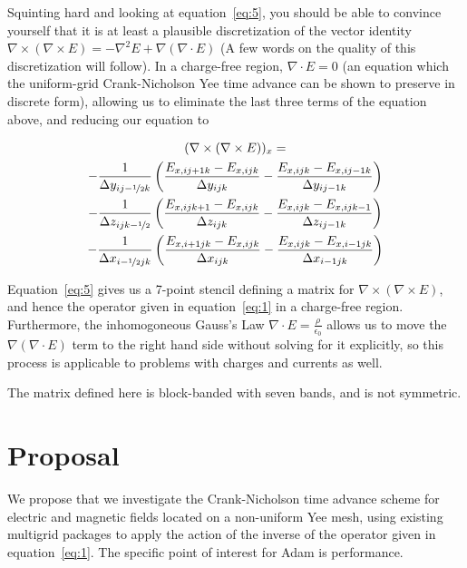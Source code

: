 \documentclass{article}
\newcommand{\Fijk}[5]{{#1}_{{#2},{#3}{#4}{#5}}}
\newcommand{\curl}[1]{\nabla \times {#1}}
\newcommand{\dxijk}[3]{\Delta x _{{#1}{#2}{#3}}}
\newcommand{\dyijk}[3]{\Delta y _{{#1}{#2}{#3}}}
\newcommand{\dzijk}[3]{\Delta z _{{#1}{#2}{#3}}}
\newcommand{\dxdual}{\Delta x_{i-\nicefrac{1}{2}jk}}
\newcommand{\dydual}{\Delta y_{ij-\nicefrac{1}{2}k}}
\newcommand{\dzdual}{\Delta z_{ijk-\nicefrac{1}{2}}}
\newcommand{\delxe}{(\curl{E})}
\begin{document}
Squinting hard and looking at equation~\ref{eq:5}, you should be able
to convince yourself that it is at least a plausible discretization of
the vector identity $\curl{ \delxe} = -\nabla^2 E + \nabla (\nabla
\cdot E)$ (A few words on the quality of this discretization will
follow).  In a charge-free region, $\nabla \cdot E = 0$ (an equation
which the uniform-grid Crank-Nicholson Yee time advance can be shown
to preserve in discrete form), allowing us to eliminate the last three
terms of the equation above, and reducing our equation to 

\begin{multline}
  \label{eq:6}
  (\curl{ \delxe})_x = \\
  - \frac{1}{\dydual}
  \left( \frac{  \Fijk{E}{x}{i}{j+1}{k}  - \Fijk{E}{x}{i}{j}{k}}
    {\dyijk{i}{j}{k}}
    - \frac{  \Fijk{E}{x}{i}{j}{k}  - \Fijk{E}{x}{i}{j-1}{k}}
    {\dyijk{i}{j-1}{k}} \right) \\
  - \frac{1}{\dzdual}
  \left( \frac{  \Fijk{E}{x}{i}{j}{k+1}  - \Fijk{E}{x}{i}{j}{k}}
    {\dzijk{i}{j}{k}}
    - \frac{  \Fijk{E}{x}{i}{j}{k}  - \Fijk{E}{x}{i}{j}{k-1}}
    {\dzijk{i}{j-1}{k}} \right) \\
  - \frac{1}{\dxdual}
  \left( \frac{  \Fijk{E}{x}{i+1}{j}{k}  - \Fijk{E}{x}{i}{j}{k}}
    {\dxijk{i}{j}{k}}
    - \frac{  \Fijk{E}{x}{i}{j}{k}  - \Fijk{E}{x}{i-1}{j}{k}}
    {\dxijk{i-1}{j}{k}} \right)
\end{multline}

Equation~\ref{eq:5} gives us a 7-point stencil defining a matrix for
$\curl{\delxe}$, and hence the operator given in equation~\ref{eq:1}
in a charge-free region.  Furthermore, the
inhomogoneous Gauss's Law $\nabla \cdot E = \frac{\rho}{\epsilon_0}$
allows us to move the $\nabla(\nabla \cdot E)$ term to the right hand
side without solving for it explicitly, so this process is applicable
to problems with charges and currents as well.

The matrix defined here is block-banded with seven bands, and is not
symmetric.

\section{Proposal}

We propose that we investigate the Crank-Nicholson time advance scheme
for electric and magnetic fields located on a non-uniform Yee mesh,
using existing multigrid packages to apply the action of the inverse
of the operator given in equation~\ref{eq:1}.  The specific point of
interest for Adam is performance.



\end{document}
